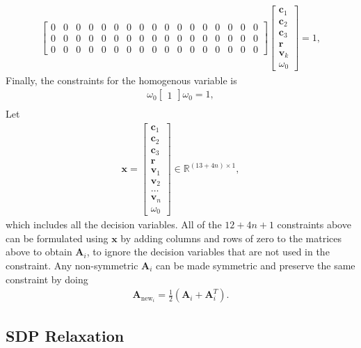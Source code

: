 \documentclass{article}
\begin{document}
\begin{align}
\begin{bmatrix}
        0 & 0 & 0 & 0 & 0 & 0 & 0 & 0 & 0 & 0 & 0 & 0 & 0 & 0 & 0 & 0 & 0 \\
        0 & 0 & 0 & 0 & 0 & 0 & 0 & 0 & 0 & 0 & 0 & 0 & 0 & 0 & 0 & 0 & 0 \\
        0 & 0 & 0 & 0 & 0 & 0 & 0 & 0 & 0 & 0 & 0 & 0 & 0 & 0 & 0 & 0 & 0
    \end{bmatrix}
    \begin{bmatrix}
        \mathbf{c}_1 \\
        \mathbf{c}_2 \\
        \mathbf{c}_3 \\
        \mathbf{r} \\
        \mathbf{v}_k \\
        \omega_0
    \end{bmatrix} = 1,
\end{align}
Finally, the constraints for the homogenous variable is 
\begin{align}
    \omega_0 \begin{bmatrix} 1 \end{bmatrix} \omega_0 = 1,\\
\end{align}
Let
\begin{align}
\mathbf{x} = \begin{bmatrix} \mathbf{c}_1 \\ \mathbf{c}_2 \\ \mathbf{c}_3 \\ \mathbf{r} \\ \mathbf{v}_1 \\ \mathbf{v}_2 \\ \dots \\ \mathbf{v}_n \\ \omega_0 \end{bmatrix} \in \mathbb{R}^{(13 + 4n) \times 1},
\end{align}
which includes all the decision variables. 
All of the $12 + 4n + 1$ constraints above can be formulated using $\mathbf{x}$ by adding columns and rows of zero to the matrices above to obtain $\mathbf{A}_i$,
to ignore the decision variables that are not used in the constraint. Any non-symmetric $\mathbf{A}_i$ can be made symmetric and preserve the same constraint by doing
\begin{align}
    \mathbf{A}_{\text{new}_i} = \frac{1}{2}(\mathbf{A}_i + \mathbf{A}_i^T).
\end{align}

\subsection{SDP Relaxation}
\end{document}
